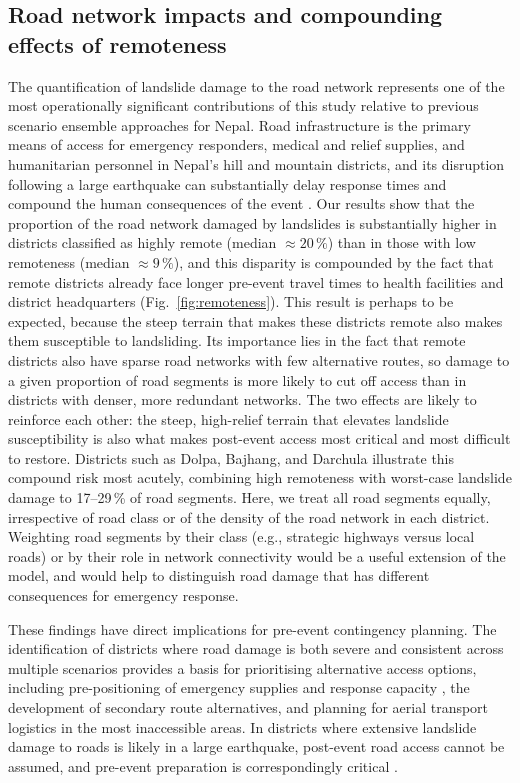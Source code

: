\documentclass[nhess, manuscript]{copernicus}
\begin{document}
\subsection{Road network impacts and compounding effects of remoteness}

The quantification of landslide damage to the road network represents one of the most operationally significant contributions of this study relative to previous scenario ensemble approaches for Nepal. Road infrastructure is the primary means of access for emergency responders, medical and relief supplies, and humanitarian personnel in Nepal's hill and mountain districts, and its disruption following a large earthquake can substantially delay response times and compound the human consequences of the event \citep{Koks2019, NationalPlanningCommission2015}. Our results show that the proportion of the road network damaged by landslides is substantially higher in districts classified as highly remote (median $\approx 20\,\%$) than in those with low remoteness (median $\approx 9\,\%$), and this disparity is compounded by the fact that remote districts already face longer pre-event travel times to health facilities and district headquarters (Fig.~\ref{fig:remoteness}). This result is perhaps to be expected, because the steep terrain that makes these districts remote also makes them susceptible to landsliding. Its importance lies in the fact that remote districts also have sparse road networks with few alternative routes, so damage to a given proportion of road segments is more likely to cut off access than in districts with denser, more redundant networks. The two effects are likely to reinforce each other: the steep, high-relief terrain that elevates landslide susceptibility is also what makes post-event access most critical and most difficult to restore. Districts such as Dolpa, Bajhang, and Darchula illustrate this compound risk most acutely, combining high remoteness with worst-case landslide damage to 17--29\,\% of road segments. Here, we treat all road segments equally, irrespective of road class or of the density of the road network in each district. Weighting road segments by their class (e.g., strategic highways versus local roads) or by their role in network connectivity would be a useful extension of the model, and would help to distinguish road damage that has different consequences for emergency response.

These findings have direct implications for pre-event contingency planning. The identification of districts where road damage is both severe and consistent across multiple scenarios provides a basis for prioritising alternative access options, including pre-positioning of emergency supplies and response capacity \citep{sijapati2025}, the development of secondary route alternatives, and planning for aerial transport logistics in the most inaccessible areas. In districts where extensive landslide damage to roads is likely in a large earthquake, post-event road access cannot be assumed, and pre-event preparation is correspondingly critical \citep{IASC2007}.
\end{document}
